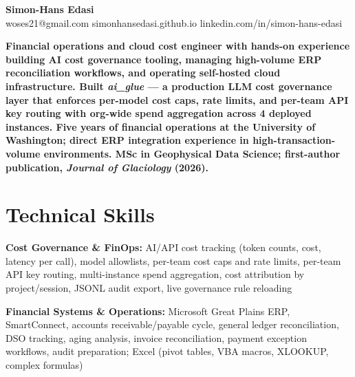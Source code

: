 \documentclass[11pt,a4paper]{article}
\begin{document}
\noindent{}

\begin{center}
    {\LARGE \textbf{Simon-Hans Edasi}} \\[6pt]
    woses21@gmail.com \hfill \textbar \hfill
    simonhansedasi.github.io \hfill \textbar \hfill
    linkedin.com/in/simon-hans-edasi
\end{center}

\vspace{0.3cm}

\noindent
\textbf{Financial operations and cloud cost engineer with hands-on experience building AI cost governance tooling, managing high-volume ERP reconciliation workflows, and operating self-hosted cloud infrastructure. Built \textit{ai\_glue} --- a production LLM cost governance layer that enforces per-model cost caps, rate limits, and per-team API key routing with org-wide spend aggregation across 4 deployed instances. Five years of financial operations at the University of Washington; direct ERP integration experience in high-transaction-volume environments. MSc in Geophysical Data Science; first-author publication, \textit{Journal of Glaciology} (2026).}

\section*{Technical Skills}

\noindent
\textbf{Cost Governance \& FinOps:} AI/API cost tracking (token counts, cost, latency per call), model allowlists, per-team cost caps and rate limits, per-team API key routing, multi-instance spend aggregation, cost attribution by project/session, JSONL audit export, live governance rule reloading

\noindent
\textbf{Financial Systems \& Operations:} Microsoft Great Plains ERP, SmartConnect, accounts receivable/payable cycle, general ledger reconciliation, DSO tracking, aging analysis, invoice reconciliation, payment exception workflows, audit preparation; Excel (pivot tables, VBA macros, XLOOKUP, complex formulas)
\end{document}
